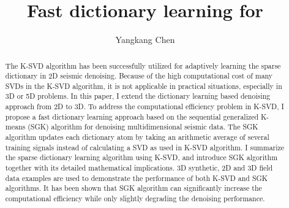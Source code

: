 


\title{Fast dictionary learning for }
\renewcommand{\thefootnote}{\fnsymbol{footnote}}
\author{Yangkang Chen}
\address{
\footnotemark[1]Previously: Bureau of Economic Geology \\
John A. and Katherine G. Jackson School of Geosciences \\
The University of Texas at Austin \\
University Station, Box X \\
Austin, TX 78713-8924 \\
ykchen@utexas.edu \\
Currently: National Center for Computational Sciences \\
Oak Ridge National Laboratory \\
One Bethel Valley Road, \\
Oak Ridge, TN 37831-6008 \\
chenyk2016@gmail.com
}
\maketitle



\begin{abstract}
The K-SVD algorithm has been successfully utilized for adaptively learning the sparse dictionary in 2D seismic denoising. Because of the high computational cost of many SVDs in the K-SVD algorithm, it is not applicable in practical situations, especially in 3D or 5D problems. In this paper, I extend the dictionary learning based denoising approach from 2D to 3D. To address the computational efficiency problem in K-SVD, I propose a fast dictionary learning approach based on the sequential generalized K-means (SGK) algorithm for denoising multidimensional seismic data. The SGK algorithm updates each dictionary atom by taking an arithmetic average of several training signals instead of calculating a SVD as used in K-SVD algorithm. I summarize the sparse dictionary learning algorithm using K-SVD, and introduce SGK algorithm together with its detailed mathematical implications. 3D synthetic, 2D and 3D field data examples are used to demonstrate the performance of both K-SVD and SGK algorithms. It has been shown that SGK algorithm can significantly increase the computational efficiency while only slightly degrading the denoising performance. 
\end{abstract}

